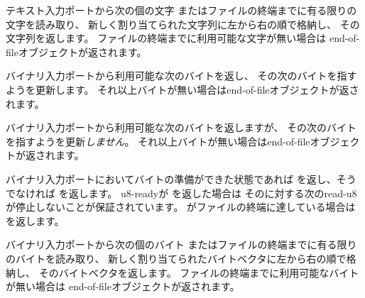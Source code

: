 \begin{entry}{%
}
\label{readstring}

テキスト入力ポートから次の個の文字
またはファイルの終端までに有る限りの文字を読み取り、
新しく割り当てられた文字列に左から右の順で格納し、
その文字列を返します。
ファイルの終端までに利用可能な文字が無い場合は
end-of-fileオブジェクトが返されます。

\end{entry}


\begin{entry}{%
}

バイナリ入力ポートから利用可能な次のバイトを返し、
その次のバイトを指すようを更新します。
それ以上バイトが無い場合はend-of-fileオブジェクトが返されます。

\end{entry}

\begin{entry}{%
}

バイナリ入力ポートから利用可能な次のバイトを返しますが、
その次のバイトを指すようを更新{\em しません}。
それ以上バイトが無い場合はend-of-fileオブジェクトが返されます。

\end{entry}

\begin{entry}{%
}


バイナリ入力ポートにおいてバイトの準備ができた状態であれば %
\schtrue{}を返し、そうでなければ \schfalse{}を返します。
{\cf u8-ready}が \schtrue{}を返した場合は
そのに対する次の{\cf read-u8}が停止しないことが保証されています。
がファイルの終端に達している場合は \schtrue{}を返します。

\end{entry}

\begin{entry}{%
}

バイナリ入力ポートから次の個のバイト
またはファイルの終端までに有る限りのバイトを読み取り、
新しく割り当てられたバイトベクタに左から右の順で格納し、
そのバイトベクタを返します。
ファイルの終端までに利用可能なバイトが無い場合は
end-of-fileオブジェクトが返されます。

\end{entry}

